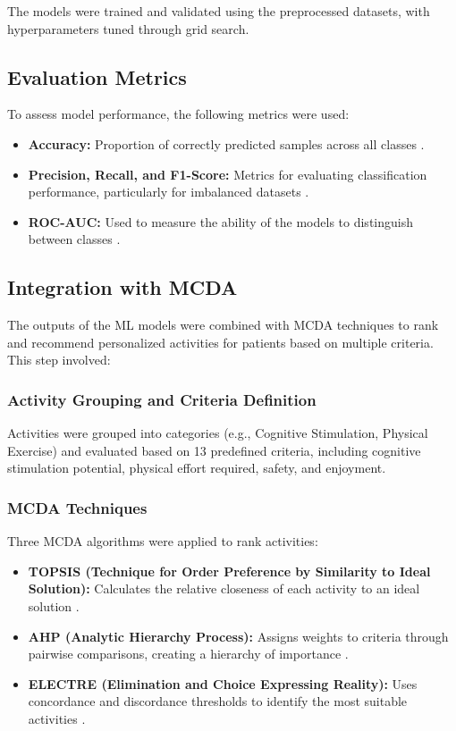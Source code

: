 \documentclass[conference]{IEEEtran}
\begin{document}
The models were trained and validated using the preprocessed datasets, with hyperparameters tuned through grid search.

\subsection{Evaluation Metrics}
To assess model performance, the following metrics were used:
\begin{itemize}
    \item \textbf{Accuracy:} Proportion of correctly predicted samples across all classes \cite{b13}.
    \item \textbf{Precision, Recall, and F1-Score:} Metrics for evaluating classification performance, particularly for imbalanced datasets \cite{b13}.
    \item \textbf{ROC-AUC:} Used to measure the ability of the models to distinguish between classes \cite{b13}.
\end{itemize}

\subsection{Integration with MCDA}
The outputs of the ML models were combined with MCDA techniques to rank and recommend personalized activities for patients based on multiple criteria. This step involved:

\subsubsection{Activity Grouping and Criteria Definition}
Activities were grouped into categories (e.g., Cognitive Stimulation, Physical Exercise) and evaluated based on 13 predefined criteria, including cognitive stimulation potential, physical effort required, safety, and enjoyment.

\subsubsection{MCDA Techniques}
Three MCDA algorithms were applied to rank activities:
\begin{itemize}
    \item \textbf{TOPSIS (Technique for Order Preference by Similarity to Ideal Solution):} Calculates the relative closeness of each activity to an ideal solution \cite{b10}.
    \item \textbf{AHP (Analytic Hierarchy Process):} Assigns weights to criteria through pairwise comparisons, creating a hierarchy of importance \cite{b11}.
    \item \textbf{ELECTRE (Elimination and Choice Expressing Reality):} Uses concordance and discordance thresholds to identify the most suitable activities \cite{b12}.
\end{itemize}
\end{document}
